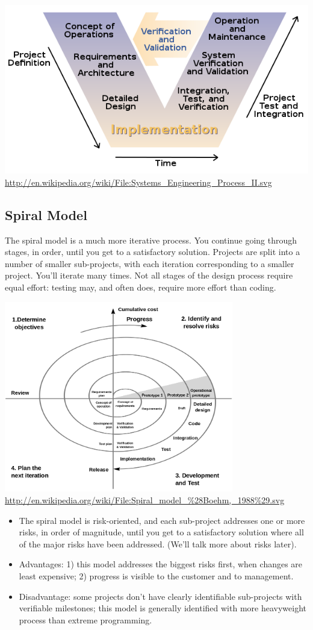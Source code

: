 \begin{center}
\includegraphics[width=.5\textwidth]{images/vmodel.png}
\hfill \url{http://en.wikipedia.org/wiki/File:Systems_Engineering_Process_II.svg}
\end{center}

\subsection*{Spiral Model}
The spiral model is a much more iterative process. 
You continue going through stages, in order, until you get to
a satisfactory solution. Projects are split into a number of smaller
sub-projects, with each iteration corresponding to a smaller project.
You'll iterate many times. Not all stages of the design process
require equal effort: testing may, and often does, require more effort
than coding.

\begin{center}
\includegraphics[width=0.75\textwidth]{images/spiral-boehm.png}
\hfill \url{http://en.wikipedia.org/wiki/File:Spiral_model_%28Boehm,_1988%29.svg}
\end{center}

\begin{itemize}
\item The spiral model is risk-oriented, and each sub-project addresses
one or more risks, in order of magnitude, until you get to a satisfactory
solution where all of the major risks
have been addressed. (We'll talk more about risks later).
\item Advantages: 1) this model addresses the biggest risks first, when
changes are least expensive; 2) progress is visible to the customer and
to management.
\item Disadvantage: some projects don't have clearly identifiable
sub-projects with verifiable milestones; this model is generally
identified with more heavyweight process than extreme programming.
\end{itemize}

